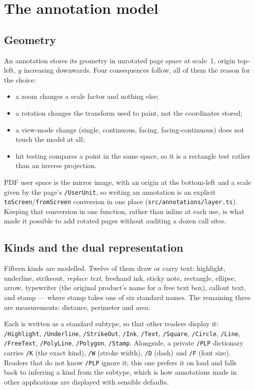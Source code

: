 \section{The annotation model}
\label{sec:annotations}

\subsection{Geometry}

An annotation stores its geometry in unrotated page space at scale~1, origin top-left, $y$
increasing downwards. Four consequences follow, all of them the reason for the choice:

\begin{itemize}
  \item a zoom changes a scale factor and nothing else;
  \item a rotation changes the transform used to paint, not the coordinates stored;
  \item a view-mode change (single, continuous, facing, facing-continuous) does not touch the
        model at all;
  \item hit testing compares a point in the same space, so it is a rectangle test rather than
        an inverse projection.
\end{itemize}

PDF user space is the mirror image, with an origin at the bottom-left and a scale given by the
page's \texttt{/UserUnit}, so writing an annotation is an explicit
\texttt{toScreen}/\texttt{fromScreen} conversion in one place
(\texttt{src/annotations/layer.ts}). Keeping that conversion in one function, rather than
inline at each use, is what made it possible to add rotated pages without auditing a dozen
call sites.

\subsection{Kinds and the dual representation}
\label{sec:annot-model}

Fifteen kinds are modelled. Twelve of them draw or carry text: highlight, underline,
strikeout, \emph{replace text}, freehand ink, sticky note, rectangle, ellipse, arrow,
typewriter (the original product's name for a free text box), callout text, and stamp --- where
stamp takes one of six standard names. The remaining three are measurements: distance,
perimeter and area.

Each is written as a standard subtype, so that other readers display it:
\texttt{/Highlight}, \texttt{/Underline}, \texttt{/StrikeOut}, \texttt{/Ink}, \texttt{/Text},
\texttt{/Square}, \texttt{/Circle}, \texttt{/Line}, \texttt{/FreeText}, \texttt{/PolyLine},
\texttt{/Polygon}, \texttt{/Stamp}. Alongside, a private \texttt{/PLP} dictionary carries
\texttt{/K} (the exact kind), \texttt{/W} (stroke width), \texttt{/D} (dash) and
\texttt{/F} (font size). Readers that do not know \texttt{/PLP} ignore it; this one prefers it
on load and falls back to inferring a kind from the subtype, which is how annotations made in
other applications are displayed with sensible defaults.


